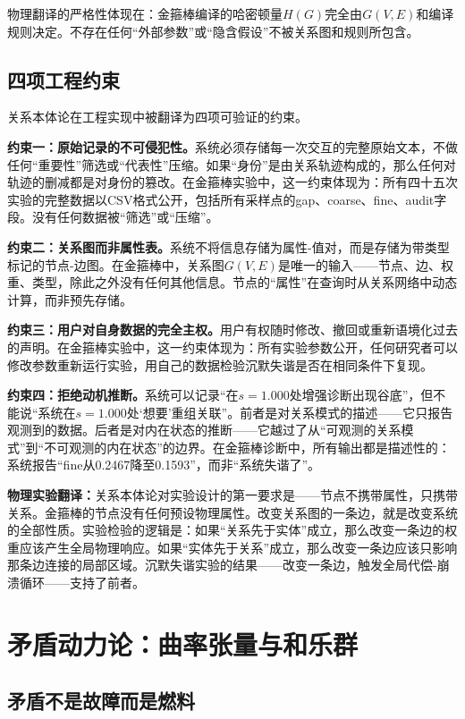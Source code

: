 \documentclass[11pt,a4paper]{book}
\theoremstyle{definition}
\begin{document}
物理翻译的严格性体现在：金箍棒编译的哈密顿量$H(G)$完全由$G(V,E)$和编译规则决定。不存在任何“外部参数”或“隐含假设”不被关系图和规则所包含。

\subsection{四项工程约束}

关系本体论在工程实现中被翻译为四项可验证的约束。

\textbf{约束一：原始记录的不可侵犯性。}系统必须存储每一次交互的完整原始文本，不做任何“重要性”筛选或“代表性”压缩。如果“身份”是由关系轨迹构成的，那么任何对轨迹的删减都是对身份的篡改。在金箍棒实验中，这一约束体现为：所有四十五次实验的完整数据以CSV格式公开，包括所有采样点的gap、coarse、fine、audit字段。没有任何数据被“筛选”或“压缩”。

\textbf{约束二：关系图而非属性表。}系统不将信息存储为属性-值对，而是存储为带类型标记的节点-边图。在金箍棒中，关系图$G(V,E)$是唯一的输入——节点、边、权重、类型，除此之外没有任何其他信息。节点的“属性”在查询时从关系网络中动态计算，而非预先存储。

\textbf{约束三：用户对自身数据的完全主权。}用户有权随时修改、撤回或重新语境化过去的声明。在金箍棒实验中，这一约束体现为：所有实验参数公开，任何研究者可以修改参数重新运行实验，用自己的数据检验沉默失谐是否在相同条件下复现。

\textbf{约束四：拒绝动机推断。}系统可以记录“在$s=1.000$处增强诊断出现谷底”，但不能说“系统在$s=1.000$处‘想要’重组关联”。前者是对关系模式的描述——它只报告观测到的数据。后者是对内在状态的推断——它越过了从“可观测的关系模式”到“不可观测的内在状态”的边界。在金箍棒诊断中，所有输出都是描述性的：系统报告“fine从0.2467降至0.1593”，而非“系统失谐了”。

\textbf{物理实验翻译：}关系本体论对实验设计的第一要求是——节点不携带属性，只携带关系。金箍棒的节点没有任何预设物理属性。改变关系图的一条边，就是改变系统的全部性质。实验检验的逻辑是：如果“关系先于实体”成立，那么改变一条边的权重应该产生全局物理响应。如果“实体先于关系”成立，那么改变一条边应该只影响那条边连接的局部区域。沉默失谐实验的结果——改变一条边，触发全局代偿-崩溃循环——支持了前者。

\section{矛盾动力论：曲率张量与和乐群}

\subsection{矛盾不是故障而是燃料}
\end{document}
